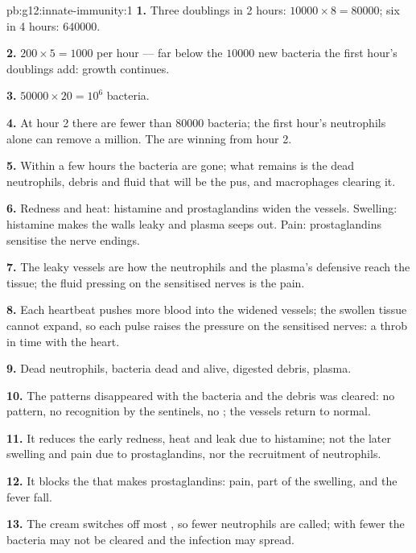 \begin{solution}{pb:g12:innate-immunity:1}
\textbf{1.} Three doublings in 2 hours: $\num{10000} \times 8 =
\num{80000}$; six in 4 hours: $\num{640000}$.

\textbf{2.} $200 \times 5 = 1000$ per hour --- far below the
$\num{10000}$ new bacteria the first hour's doublings add: growth
continues.

\textbf{3.} $\num{50000} \times 20 = 10^6$ bacteria.

\textbf{4.} At hour 2 there are fewer than $\num{80000}$ bacteria; the
first hour's neutrophils alone can remove a million. The 
are winning from hour 2.

\textbf{5.} Within a few hours the bacteria are gone; what remains is
the dead neutrophils, debris and fluid that will be the pus, and
macrophages clearing it.

\textbf{6.} Redness and heat: histamine and prostaglandins widen the
vessels. Swelling: histamine makes the walls leaky and plasma seeps
out. Pain: prostaglandins sensitise the nerve endings.

\textbf{7.} The leaky vessels are how the neutrophils and the plasma's
defensive  reach the tissue; the fluid pressing on the
sensitised nerves is the pain.

\textbf{8.} Each heartbeat pushes more blood into the widened vessels;
the swollen tissue cannot expand, so each pulse raises the pressure on
the sensitised nerves: a throb in time with the heart.

\textbf{9.} Dead neutrophils, bacteria dead and alive, digested debris,
plasma.

\textbf{10.} The patterns disappeared with the bacteria and the debris
was cleared: no pattern, no recognition by the sentinels, no
; the vessels return to normal.

\textbf{11.} It reduces the early redness, heat and leak due to
histamine; not the later swelling and pain due to prostaglandins, nor
the recruitment of neutrophils.

\textbf{12.} It blocks the  that makes prostaglandins: pain,
part of the swelling, and the fever fall.

\textbf{13.} The cream switches off most , so fewer neutrophils
are called; with fewer  the bacteria may not be cleared and
the infection may spread.


\end{solution}
